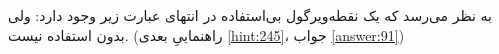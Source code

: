 \section{}
\paragraph{}\label{hint:187}
به نظر می‌رسد که یک نقطه‌ویرگول بی‌استفاده در انتهای عبارت زیر وجود دارد:
\LTR\noindent
{}
\RTL
ولی بدون استفاده نیست. (راهنماییِ بعدی \ref{hint:245}، جواب \ref{answer:91})
